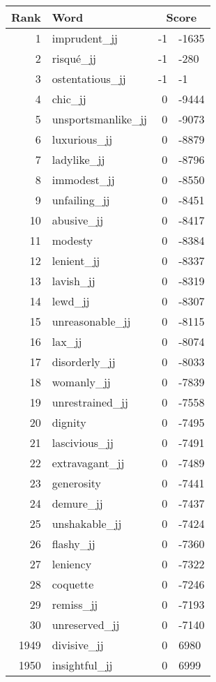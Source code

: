 \begin{longtable}[!htbp]{| rlr@{.}l |}
    \hline
    \textbf{Rank} & \textbf{Word} & \multicolumn{2}{c|}{\textbf{Score}} \\
    \hline
    \endhead
    1 & imprudent\_jj & -1 & -1635 \\
    2 & risqué\_jj & -1 & -280 \\
    3 & ostentatious\_jj & -1 & -1 \\
    4 & chic\_jj & 0 & -9444 \\
    5 & unsportsmanlike\_jj & 0 & -9073 \\
    6 & luxurious\_jj & 0 & -8879 \\
    7 & ladylike\_jj & 0 & -8796 \\
    8 & immodest\_jj & 0 & -8550 \\
    9 & unfailing\_jj & 0 & -8451 \\
    10 & abusive\_jj & 0 & -8417 \\
    11 & modesty & 0 & -8384 \\
    12 & lenient\_jj & 0 & -8337 \\
    13 & lavish\_jj & 0 & -8319 \\
    14 & lewd\_jj & 0 & -8307 \\
    15 & unreasonable\_jj & 0 & -8115 \\
    16 & lax\_jj & 0 & -8074 \\
    17 & disorderly\_jj & 0 & -8033 \\
    18 & womanly\_jj & 0 & -7839 \\
    19 & unrestrained\_jj & 0 & -7558 \\
    20 & dignity & 0 & -7495 \\
    21 & lascivious\_jj & 0 & -7491 \\
    22 & extravagant\_jj & 0 & -7489 \\
    23 & generosity & 0 & -7441 \\
    24 & demure\_jj & 0 & -7437 \\
    25 & unshakable\_jj & 0 & -7424 \\
    26 & flashy\_jj & 0 & -7360 \\
    27 & leniency & 0 & -7322 \\
    28 & coquette & 0 & -7246 \\
    29 & remiss\_jj & 0 & -7193 \\
    30 & unreserved\_jj & 0 & -7140 \\
    1949 & divisive\_jj & 0 & 6980 \\
    1950 & insightful\_jj & 0 & 6999 \\

\end{longtable}
